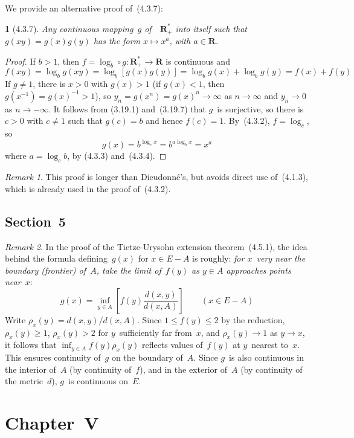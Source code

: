 \documentclass[letterpaper,12pt]{article}
\newcommand{\R}{\mathbf{R}}
\newcommand{\Rp}{\R_+}
\newcommand{\Rps}{\Rp^*}
\newcommand{\after}{\circ}
\newcommand{\inv}[1]{#1^{-1}}
\theoremstyle{plain}
\newtheorem*{prop}{}
\theoremstyle{definition}
\theoremstyle{remark}
\newtheorem*{rmk}{Remark}
\begin{document}
\noindent We provide an alternative proof of~(4.3.7):
\begin{prop}[4.3.7]
Any continuous mapping~\(g\) of~~\(\Rps\) into itself such that \(g(xy)=g(x)g(y)\) has the form \(x\mapsto x^a\), with \(a\in\R\).
\end{prop}
\begin{proof}
If \(b>1\), then \(f=\log_b\after g:\Rps\to\R\) is continuous and
\[f(xy)=\log_b g(xy)=\log_b[g(x)g(y)]=\log_b g(x)+\log_b g(y)=f(x)+f(y)\]
If \(g\ne1\), there is \(x>0\) with \(g(x)>1\) (if \(g(x)<1\), then \(g(\inv{x})=\inv{g(x)}>1\)), so \(y_n=g(x^n)=g(x)^n\to\infty\) as \(n\to\infty\) and \(y_n\to 0\) as \(n\to-\infty\). It follows from (3.19.1) and~(3.19.7) that \(g\)~is surjective, so there is \(c>0\) with \(c\ne 1\) such that \(g(c)=b\) and hence \(f(c)=1\). By~(4.3.2), \(f=\log_c\), so
\[g(x)=b^{\log_c x}=b^{a\log_b x}=x^a\]
where \(a=\log_c b\), by (4.3.3) and~(4.3.4).
\end{proof}
\begin{rmk}
This proof is longer than Dieudonn\'e's, but avoids direct use of~(4.1.3), which is already used in the proof of~(4.3.2).
\end{rmk}

\subsection*{Section~5}
\begin{rmk}
In the proof of the Tietze-Urysohn extension theorem~(4.5.1), the idea behind the formula defining~\(g(x)\) for \(x\in E-A\) is roughly: \emph{for \(x\)~very near the boundary (frontier) of~\(A\), take the limit of~\(f(y)\) as \(y\in A\) approaches points near~\(x\)}:
\[g(x)=\inf_{y\in A}\left[f(y)\frac{d(x,y)}{d(x,A)}\right]\qquad(x\in E-A)\]
Write \(\rho_x(y)=d(x,y)/d(x,A)\). Since \(1\le f(y)\le 2\) by the reduction, \(\rho_x(y)\ge 1\), \(\rho_x(y)>2\) for \(y\)~sufficiently far from~\(x\), and \(\rho_x(y)\to 1\) as \(y\to x\), it follows that \(\inf_{y\in A}f(y)\rho_x(y)\) reflects values of~\(f(y)\) at \(y\)~nearest to~\(x\). This ensures continuity of~\(g\) on the boundary of~\(A\). Since \(g\)~is also continuous in the interior of~\(A\) (by continuity of~\(f\)), and in the exterior of~\(A\) (by continuity of the metric~\(d\)), \(g\)~is continuous on~\(E\).
\end{rmk}

\section*{Chapter~V}
\end{document}
